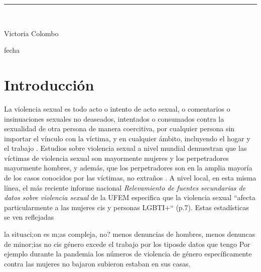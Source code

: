 \documentclass[10 pt]{article}
\begin{document}
\begin{titlepage}
\begin{center}
    
    \vspace*{0.3in}
    \rule{80mm}{0.1mm}\\
    \vspace*{0.1in}
    \begin{large}
    Victoria Colombo
    
    \vspace*{0.3in}
    
    \vspace*{0.1in}fecha
    \end{large}
    \end{center}
    
    \end{titlepage}

\newpage

\begin{abstract}

\end{abstract}
\newpage
\section*{Introducción}\label{intro}


La violencia sexual es todo acto o intento de acto sexual, o comentarios o insinuaciones sexuales no deaseados, intentados o consumados contra la sexualidad de otra persona de manera coercitiva, por cualquier persona sin importar el vínculo con la víctima, y en cualquier ámbito, incluyendo el hogar y el trabajo \citep*{ferris2002world}. Estudios sobre violencia sexual a nivel mundial demuestran que las víctimas de violencia sexual son mayormente mujeres y los perpetradores mayormente hombres, y además, que los perpetradores son en la amplia mayoría de los casos conocidos por las víctimas, no extraños \citep*{garcia2005multi,contreras2016violencia}. A nivel local, en esta misma línea, el más reciente informe nacional \textit{Relevamiento de fuentes secundarias de datos sobre violencia sexual} de la UFEM \citep*{ufem_relevamiento} especifica que la violencia sexual “afecta particularmente a las mujeres cis y personas LGBTI+“ (p.7). Estas estadísticas se ven reflejadas   




la situaci;on es m;as compleja, no? menos denuncias de hombres, menos denuncas de minor;ias no cis género excede el trabajo por los tiposde datos que tengo
Por ejemplo durante la pandemia los números de violencia de género específicamente contra las mujeres no bajaron subieron estaban en sus casas.
\end{document}
